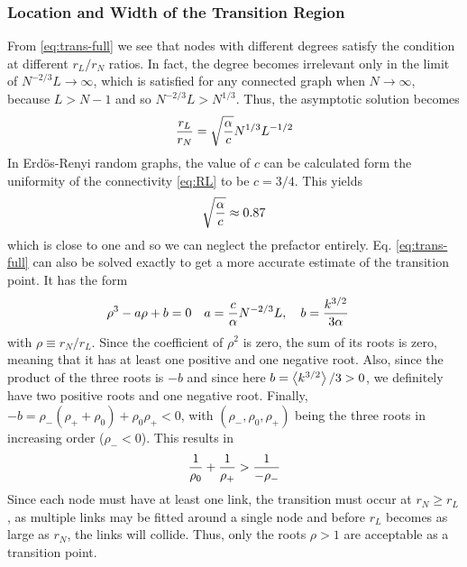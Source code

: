 \documentclass[linenumbers,endfloats,nofootinbib,preprint,floatfix,titlepage,superscriptaddress]{revtex4-1} %
\begin{document}
\subsubsection{Location and Width of the Transition Region}
From \eqref{eq:trans-full} we see that nodes with different degrees satisfy the condition at different $r_L/r_N$ ratios. 
In fact, the degree becomes irrelevant only in the limit of $N^{-2/3} L \to \infty$, which is satisfied for any connected graph when $N\to \infty$, because $L> N-1$ and so $N^{-2/3} L > N^{1/3}$.  
Thus, the asymptotic solution becomes
\begin{align}
    {r_L\over r_N} = \sqrt{{\alpha \over c}}%
    N^{1/3}L^{-1/2} %
\end{align}
In Erd\"os-Renyi random graphs, the value of $c$ can be calculated form the uniformity of the connectivity \eqref{eq:RL} to be $c=3/4$. This yields 
\[ \sqrt{{\alpha \over c}} \approx 0.87 \]
which is close to one and so we can neglect the prefactor entirely. 
Eq. \eqref{eq:trans-full} can also be solved exactly to get a more accurate estimate of the transition point. 
It has the form 
\begin{align}
    &\rho^3 - a \rho + b =0 & a&= {c\over \alpha} N^{-2/3} L ,
    \quad b={ k^{3/2}\over 3\alpha } 
    \label{eq:rhoab}
\end{align}
with $\rho \equiv r_N/r_L$.
Since the coefficient of $\rho^2$ is zero, the sum of its roots is zero, meaning that it has at least one positive and one negative root.
Also, since the product of the three roots is $-b$ and since here $b= \left<k^{3/2}\right>/3>0$, we definitely have two positive roots and one negative root. 
Finally, $-b = \rho_-(\rho_++\rho_0) +\rho_0\rho_+ <0$, with $(\rho_-,\rho_0,\rho_+)$ being the three roots in increasing order ($\rho_-<0$). 
This results in 
\[{1\over \rho_0} + {1\over \rho_+} > {1\over -\rho_-}\]
Since each node must have at least one link, the transition must occur at $r_N \geq r_L$, as multiple links may be fitted around a single node and before $r_L$ becomes as large as $r_N$, the links will collide. 
Thus, only the roots $\rho > 1$ are acceptable as a transition point. 
\end{document}
